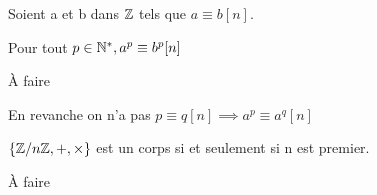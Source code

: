 \documentclass[a4paper, 12pt]{article}
\begin{document}
\begin{lemme}
    Soient a et b dans $\mathbb{Z}$ tels que $a \equiv b [n]$.

    Pour tout $p \in \mathbb{N}^*, a^p \equiv b^p [n]$
\end{lemme}

\begin{demonstration}
    À faire
\end{demonstration}

\begin{remark}
    En revanche on n'a pas $p \equiv q [n] \implies a^p \equiv a^q [n]$
\end{remark}

\begin{theorem}
    $\{\mathbb{Z}/n\mathbb{Z}, +, \times\}$ est un corps si et seulement si n est premier.
\end{theorem}

\begin{demonstration}
    À faire
\end{demonstration}
\end{document}
